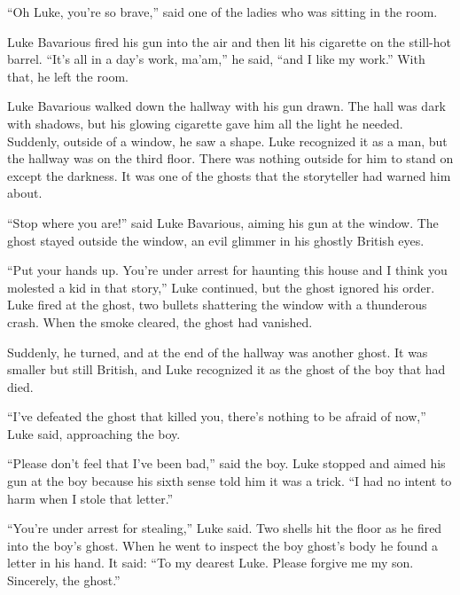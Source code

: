 ``Oh Luke, you're so brave,'' said one of the ladies who was sitting
in the room.



Luke Bavarious fired his gun into the air and then lit his
cigarette on the still-hot barrel. ``It's all in a day's work,
ma'am,'' he said, ``and I like my work.'' With that, he left the
room.



Luke Bavarious walked down the hallway with his gun drawn. The hall
was dark with shadows, but his glowing cigarette gave him all the
light he needed. Suddenly, outside of a window, he saw a shape.
Luke recognized it as a man, but the hallway was on the third
floor. There was nothing outside for him to stand on except the
darkness. It was one of the ghosts that the storyteller had warned
him about.



``Stop where you are!'' said Luke Bavarious, aiming his gun at the
window. The ghost stayed outside the window, an evil glimmer in his
ghostly British eyes.



``Put your hands up. You're under arrest for haunting this house and
I think you molested a kid in that story,'' Luke continued, but the
ghost ignored his order. Luke fired at the ghost, two bullets
shattering the window with a thunderous crash. When the smoke
cleared, the ghost had vanished.



Suddenly, he turned, and at the end of the hallway was another
ghost. It was smaller but still British, and Luke recognized it as
the ghost of the boy that had died.



``I've defeated the ghost that killed you, there's nothing to be
afraid of now,'' Luke said, approaching the boy.



``Please don't feel that I've been bad,'' said the boy. Luke stopped
and aimed his gun at the boy because his sixth sense told him it
was a trick. ``I had no intent to harm when I stole that
letter.''



``You're under arrest for stealing,'' Luke said. Two shells hit the
floor as he fired into the boy's ghost. When he went to inspect the
boy ghost's body he found a letter in his hand. It said: ``To my
dearest Luke. Please forgive me my son. Sincerely, the
ghost.''



